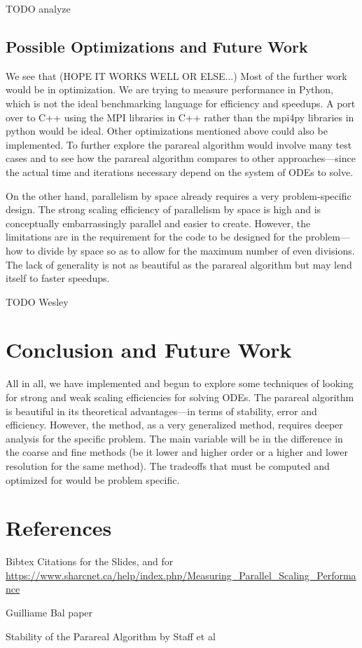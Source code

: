 \documentclass[letterpaper,12pt]{article}
\begin{document}
TODO analyze

\subsection{Possible Optimizations and Future Work}

We see that (HOPE IT WORKS WELL OR ELSE...) Most of the further work would be in
optimization. We are trying to measure performance in Python, which is not the
ideal benchmarking language for efficiency and speedups. A port over to C++
using the MPI libraries in C++ rather than the mpi4py libraries in python would
be ideal. Other optimizations mentioned above could also be implemented. To
further explore the parareal algorithm would involve many test cases and to see
how the parareal algorithm compares to other approaches---since the actual time
and iterations necessary depend on the system of ODEs to solve.

On the other hand, parallelism by space already requires a very problem-specific
design. The strong scaling efficiency of parallelism by space is high and is
conceptually embarrassingly parallel and easier to create. However, the
limitations are in the requirement for the code to be designed for the
problem---how to divide by space so as to allow for the maximum number of even
divisions. The lack of generality is not as beautiful as the parareal algorithm
but may lend itself to faster speedups.

TODO Wesley

\section{Conclusion and Future Work}


All in all, we have implemented and begun to explore some techniques of looking
for strong and weak scaling efficiencies for solving ODEs. The parareal
algorithm is beautiful in its theoretical advantages---in terms of stability,
error and efficiency. However, the method, as a very generalized method,
requires deeper analysis for the specific problem. The main variable will be in
the difference in the coarse and fine methods (be it lower and higher order or a
higher and lower resolution for the same method). The tradeoffs that must be
computed and optimized for would be problem specific.

\section{References}

Bibtex Citations for the Slides, and for \url{https://www.sharcnet.ca/help/index.php/Measuring_Parallel_Scaling_Performance}

%
%

Guilliame Bal paper

Stability of the Parareal Algorithm by Staff et al
\end{document}
